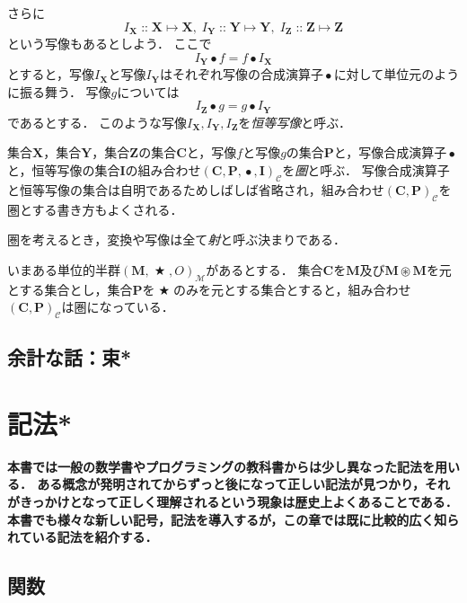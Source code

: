 \documentclass[twocolumn]{jsbook}
\DeclareMathOperator{\mathAnyBinaryOperator}{\bigstar}
\DeclareMathOperator{\mathCompose}{\bullet}
\DeclareMathOperator{\mathIn}{::}
\DeclareMathOperator{\mathMapsTo}{\mapsto}
\DeclareMathOperator{\mathSetTimes}{\circledast}
\newcommand{\mathSet}[1]{\mathbf{#1}}
\newcommand{\mathCategoryShort}[2]{(#1,#2)_\mathcal{C}}
\newcommand{\mathMorph}[2]{#1\mathMapsTo#2}
\newcommand{\mathMonoid}[3]{(#1,#2,#3)_\mathcal{M}}
\newcommand{\mathCategory}[4]{(#1,#2,#3,#4)_\mathcal{C}}
\newcommand{\keyword}[1]{\emph{#1}}
\newenvironment{leader}{\begingroup\bf}{\endgroup}
\begin{document}
さらに$$I_\mathSet{X}\mathIn\mathMorph{\mathSet{X}}{\mathSet{X}},\;I_\mathSet{Y}\mathIn\mathMorph{\mathSet{Y}}{\mathSet{Y}},\;I_\mathSet{Z}\mathIn\mathMorph{\mathSet{Z}}{\mathSet{Z}}$$という写像もあるとしよう．
ここで$$I_\mathSet{Y}\mathCompose f=f\mathCompose I_\mathSet{X}$$とすると，写像$I_\mathSet{X}$と写像$I_\mathSet{Y}$はそれぞれ写像の合成演算子$\mathCompose$に対して単位元のように振る舞う．
写像$g$については$$I_\mathSet{Z}\mathCompose g=g\mathCompose I_\mathSet{Y}$$であるとする．
このような写像$I_\mathSet{X},I_\mathSet{Y},I_\mathSet{Z}$を\keyword{恒等写像}と呼ぶ．

集合$\mathSet{X}$，集合$\mathSet{Y}$，集合$\mathSet{Z}$の集合$\mathSet{C}$と，写像$f$と写像$g$の集合$\mathSet{P}$と，写像合成演算子$\mathCompose$と，恒等写像の集合$\mathSet{I}$の組み合わせ$\mathCategory{\mathSet{C}}{\mathSet{P}}{\mathCompose}{\mathSet{I}}$を\keyword{圏}と呼ぶ．
写像合成演算子と恒等写像の集合は自明であるためしばしば省略され，組み合わせ$\mathCategoryShort{\mathSet{C}}{\mathSet{P}}$を圏とする書き方もよくされる．

圏を考えるとき，変換や写像は全て\keyword{射}と呼ぶ決まりである．

いまある単位的半群$\mathMonoid{\mathSet{M}}{\mathAnyBinaryOperator}{O}$があるとする．
集合$\mathSet{C}$を$\mathSet{M}$及び$\mathSet{M}\mathSetTimes\mathSet{M}$を元とする集合とし，集合$\mathSet{P}$を$\mathAnyBinaryOperator$のみを元とする集合とすると，組み合わせ$\mathCategoryShort{\mathSet{C}}{\mathSet{P}}$は圏になっている．

\section*{余計な話：束*}


\chapter{記法*}

\begin{leader}
本書では一般の数学書やプログラミングの教科書からは少し異なった記法を用いる．
ある概念が発明されてからずっと後になって正しい記法が見つかり，それがきっかけとなって正しく理解されるという現象は歴史上よくあることである．
本書でも様々な新しい記号，記法を導入するが，この章では既に比較的広く知られている記法を紹介する．
\end{leader}


\section{関数}
\end{document}

